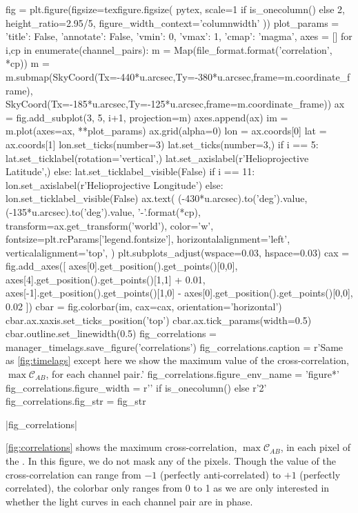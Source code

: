 \begin{pycode}
fig = plt.figure(figsize=texfigure.figsize(
    pytex,
    scale=1 if is_onecolumn() else 2,
    height_ratio=2.95/5,
    figure_width_context='columnwidth'
))
plot_params = {
    'title': False, 
    'annotate': False,
    'vmin': 0,
    'vmax': 1,
    'cmap': 'magma',
}
axes = []
for i,cp in enumerate(channel_pairs):
    m = Map(file_format.format('correlation', *cp))
    m = m.submap(SkyCoord(Tx=-440*u.arcsec,Ty=-380*u.arcsec,frame=m.coordinate_frame),
                 SkyCoord(Tx=-185*u.arcsec,Ty=-125*u.arcsec,frame=m.coordinate_frame))
    ax = fig.add_subplot(3, 5, i+1, projection=m)
    axes.append(ax)
    im = m.plot(axes=ax, **plot_params)
    ax.grid(alpha=0)
    lon = ax.coords[0]
    lat = ax.coords[1]
    lon.set_ticks(number=3)
    lat.set_ticks(number=3,) 
    if i == 5:
        lat.set_ticklabel(rotation='vertical',)
        lat.set_axislabel(r'Helioprojective Latitude',)
    else:
        lat.set_ticklabel_visible(False)
    if i == 11:
        lon.set_axislabel(r'Helioprojective Longitude')
    else:
        lon.set_ticklabel_visible(False)
    ax.text(
        (-430*u.arcsec).to('deg').value,
        (-135*u.arcsec).to('deg').value,
        '{}-{}'.format(*cp),
        transform=ax.get_transform('world'),
        color='w',
        fontsize=plt.rcParams['legend.fontsize'],
        horizontalalignment='left',
        verticalalignment='top',
    )
plt.subplots_adjust(wspace=0.03, hspace=0.03)
cax = fig.add_axes([
    axes[0].get_position().get_points()[0,0],
    axes[4].get_position().get_points()[1,1] + 0.01,
    axes[-1].get_position().get_points()[1,0] - axes[0].get_position().get_points()[0,0], 
    0.02
])
cbar = fig.colorbar(im, cax=cax, orientation='horizontal')
cbar.ax.xaxis.set_ticks_position('top')
cbar.ax.tick_params(width=0.5)
cbar.outline.set_linewidth(0.5)
fig_correlations = manager_timelags.save_figure('correlations')
fig_correlations.caption = r'Same as \autoref{fig:timelags} except here we show the maximum value of the cross-correlation, $\max\mathcal{C}_{AB}$, for each channel pair.'
fig_correlations.figure_env_name = 'figure*'
fig_correlations.figure_width = r'\columnwidth' if is_onecolumn() else r'2\columnwidth'
fig_correlations.fig_str = fig_str
\end{pycode}
|fig_correlations|

\autoref{fig:correlations} shows the maximum cross-correlation, $\max\mathcal{C}_{AB}$, in each pixel of the \AR{}.
In this figure, we do not mask any of the pixels. Though the value of the cross-correlation can range from $-1$ (perfectly anti-correlated) to $+1$ (perfectly correlated), the colorbar only ranges from 0 to 1 as we are only interested in whether the light curves in each channel pair are in phase.

